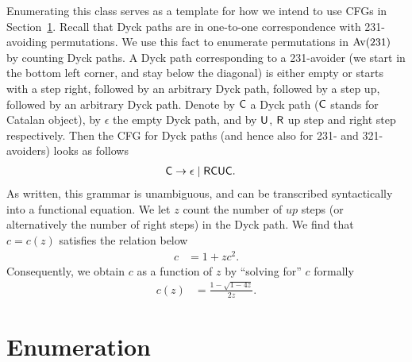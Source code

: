 \documentclass[12pt, a4paper, twoside]{report}
\begin{document}
\begin{example}[Enumerating $\Av(231)$]
Enumerating this class serves as a template for how we intend to use CFGs in Section~\ref{sec:enum}. Recall that Dyck paths are in one-to-one correspondence with 231-avoiding permutations. We use this fact to enumerate permutations in $\Av(231)$ by counting Dyck paths. A Dyck path corresponding to a 231-avoider (we start in the bottom left corner, and stay below the diagonal) is either empty or starts with a step right, followed by an arbitrary Dyck path, followed by a step up, followed by an arbitrary Dyck path. Denote by $\mathsf{C}$ a Dyck path ($\mathsf{C}$ stands for Catalan object), by $\epsilon$ the empty Dyck path, and by $\mathsf{U}$, $\mathsf{R}$ up step and right step respectively. Then the CFG for Dyck paths (and hence also for 231- and 321-avoiders) looks as follows
\begin{align*}
\mathsf{C} &\to \epsilon \mid \mathsf{R}\mathsf{C}\mathsf{U}\mathsf{C}.
\end{align*}
\noindent As written, this grammar is unambiguous, and can be transcribed syntactically into a functional equation. We let $z$ count the number of $up$ steps (or alternatively the number of right steps) in the Dyck path. We find that $c = c(z)$ satisfies the relation below 
\begin{align*}
c &= 1 + zc^2.
\end{align*}
\noindent Consequently, we obtain $c$ as a function of $z$ by ``solving for'' $c$ formally
\begin{align*}
c(z) &= \frac{1 -\sqrt{1-4z}}{2z}.
\end{align*}
\end{example}

\section{Enumeration}
\label{sec:enum}
\end{document}
